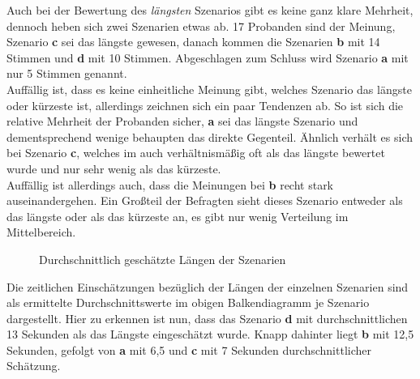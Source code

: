 \documentclass{Paper}
\begin{document}
Auch bei der Bewertung des \textit{längsten} Szenarios gibt es keine ganz klare Mehrheit, dennoch heben sich zwei Szenarien etwas ab. 17 Probanden sind der Meinung, Szenario \textbf{c} sei das längste gewesen, danach kommen die Szenarien \textbf{b} mit 14 Stimmen und \textbf{d} mit 10 Stimmen. Abgeschlagen zum Schluss wird Szenario \textbf{a} mit nur 5 Stimmen genannt.\\
Auffällig ist, dass es keine einheitliche Meinung gibt, welches Szenario das längste oder kürzeste ist, allerdings zeichnen sich ein paar Tendenzen ab. So ist sich die relative Mehrheit der Probanden sicher, \textbf{a} sei das längste Szenario und dementsprechend wenige behaupten das direkte Gegenteil. Ähnlich verhält es sich bei Szenario \textbf{c}, welches im auch verhältnismäßig oft als das längste bewertet wurde und nur sehr wenig als das kürzeste.\\
Auffällig ist allerdings auch, dass die Meinungen bei \textbf{b} recht stark auseinandergehen. Ein Großteil der Befragten sieht dieses Szenario entweder als das längste oder als das kürzeste an, es gibt nur wenig Verteilung im Mittelbereich.
	
	
	
\begin{figure}	[H]
\caption{Durchschnittlich geschätzte Längen der Szenarien}
\label{LaengeSzenarien}
\end{figure}
\par
Die zeitlichen Einschätzungen bezüglich der Längen der einzelnen Szenarien sind als ermittelte Durchschnittswerte im obigen Balkendiagramm je Szenario dargestellt. Hier zu erkennen ist nun, dass das Szenario \textbf{d} mit durchschnittlichen 13 Sekunden als das Längste eingeschätzt wurde. Knapp dahinter liegt \textbf{b} mit 12,5 Sekunden, gefolgt von \textbf{a} mit 6,5 und \textbf{c} mit 7 Sekunden durchschnittlicher Schätzung.
\end{document}
